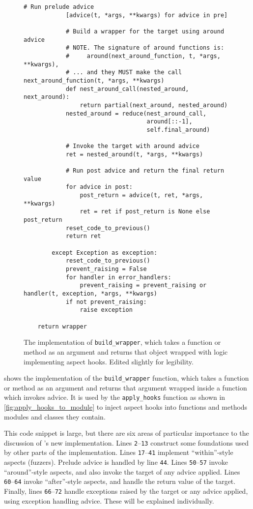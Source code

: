 \begin{figure}
\begin{lstlisting}[style=footnotesize_python]
            # Run prelude advice
            [advice(t, *args, **kwargs) for advice in pre]

            # Build a wrapper for the target using around advice
            # NOTE. The signature of around functions is:
            #     around(next_around_function, t, *args, **kwargs),
            # ... and they MUST make the call next_around_function(t, *args, **kwargs)
            def nest_around_call(nested_around, next_around):
                return partial(next_around, nested_around)
            nested_around = reduce(nest_around_call,
                                   around[::-1],
                                   self.final_around)

            # Invoke the target with around advice
            ret = nested_around(t, *args, **kwargs)
            
            # Run post advice and return the final return value
            for advice in post:
                post_return = advice(t, ret, *args, **kwargs)
                ret = ret if post_return is None else post_return
            reset_code_to_previous()
            return ret

        except Exception as exception:
            reset_code_to_previous()
            prevent_raising = False
            for handler in error_handlers:
                prevent_raising = prevent_raising or handler(t, exception, *args, **kwargs)
            if not prevent_raising:
                raise exception

    return wrapper
    \end{lstlisting}
    \caption{The implementation of \lstinline{build_wrapper}, which takes a
    function or method as an argument and returns that object wrapped with logic
    implementing aspect hooks. Edited slightly for legibility.}
    \label{fig:build_wrapper_impl}
\end{figure}

 shows the implementation of the
\lstinline{build_wrapper} function, which takes a function or method as an
argument and returns that argument wrapped inside a function which invokes
advice. It is used by the \lstinline{apply_hooks} function as shown in
\cref{fig:apply_hooks_to_module} to inject aspect hooks into functions and
methods modules and classes they contain.

This code snippet is large, but there are six areas of particular importance to
the discussion of \pdsf{}'s new implementation. Lines \texttt{2}--\texttt{13}
construct some foundations used by other parts of the implementation. Lines
\texttt{17}--\texttt{41} implement ``within''-style aspects (fuzzers). Prelude
advice is handled by line \texttt{44}. Lines
\texttt{50}--\texttt{57} invoke ``around''-style aspects, and also invoke the target
of any advice applied. Lines
\texttt{60}--\texttt{64} invoke ``after''-style aspects, and handle the return
value of the target. Finally, lines \texttt{66}--\texttt{72} handle exceptions
raised by the target or any advice applied, using exception handling advice.
These will be explained individually.

